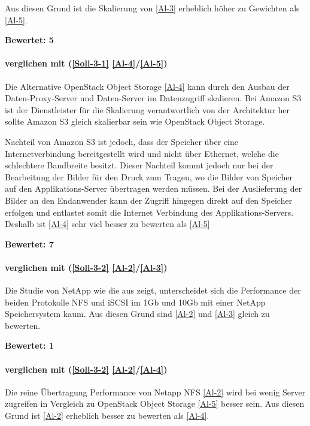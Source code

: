 Aus diesen Grund ist die Skalierung von  \ref{Al-3} erheblich höher zu Gewichten als  \ref{Al-5}.

\textbf{Bewertet: 5}


\paragraph*{  verglichen mit  (\ref{Soll-3-1} \ref{Al-4}/\ref{Al-5})}
Die Alternative OpenStack Object Storage \ref{Al-4} kann durch den Ausbau der Daten-Proxy-Server und Daten-Server im Datenzugriff skalieren. Bei Amazon S3 ist der Dienstleister für die Skalierung verantwortlich von der Architektur her sollte Amazon S3 gleich skalierbar sein wie OpenStack Object Storage.

Nachteil von Amazon S3 ist jedoch, dass der Speicher über eine Internetverbindung bereitgestellt wird und nicht über Ethernet, welche die schlechtere Bandbreite besitzt. Dieser Nachteil kommt jedoch nur bei der Bearbeitung der Bilder für den Druck zum Tragen, wo die Bilder von Speicher auf den Applikations-Server übertragen werden müssen. Bei der Auslieferung der Bilder an den Endanwender kann der Zugriff hingegen direkt auf den Speicher erfolgen und entlastet somit die Internet Verbindung des Applikations-Servers.
Deshalb ist  \ref{Al-4} sehr viel besser zu bewerten als  \ref{Al-5}

\textbf{Bewertet: 7}


\paragraph*{  verglichen mit  (\ref{Soll-3-2} \ref{Al-2}/\ref{Al-3})}
Die Studie von NetApp wie die  aus  zeigt, unterscheidet sich die Performance der beiden Protokolle NFS und iSCSI im 1Gb und 10Gb mit einer NetApp Speichersystem kaum. Aus diesen Grund sind \ref{Al-2} und \ref{Al-3} gleich zu bewerten.

\textbf{Bewertet: 1}

\paragraph*{  verglichen mit  (\ref{Soll-3-2} \ref{Al-2}/\ref{Al-4})}
Die reine Übertragung Performance von Netapp NFS \ref{Al-2} wird bei wenig Server zugreifen in Vergleich zu OpenStack Object Storage \ref{Al-5} besser sein. Aus diesen Grund ist \ref{Al-2} erheblich besser zu bewerten als \ref{Al-4}.
 
